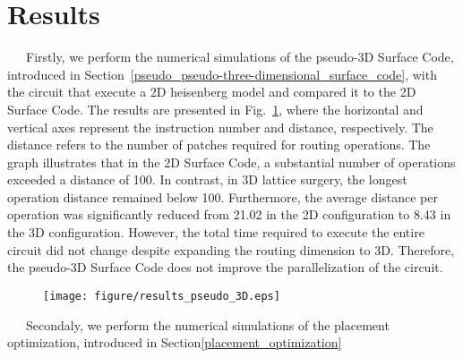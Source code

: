 \documentclass[a4paper,11pt]{ltjsarticle}
\begin{document}
\section{Results}\label{results}{
    \ \ \ Firstly, we perform the numerical simulations of the pseudo-3D Surface Code, introduced in Section~\ref{pseudo_pseudo-three-dimensional_surface_code}, with the circuit that execute a 2D heisenberg model and compared it to the 2D Surface Code. The results are presented in Fig.~\ref{results_of_pseudo_3D}, where the horizontal and vertical axes represent the instruction number and distance, respectively. The distance refers to the number of patches required for routing operations. The graph illustrates that in the 2D Surface Code, a substantial number of operations exceeded a distance of 100. In contrast, in 3D lattice surgery, the longest operation distance remained below 100. Furthermore, the average distance per operation was significantly reduced from 21.02 in the 2D configuration to 8.43 in the 3D configuration. However, the total time required to execute the entire circuit did not change despite expanding the routing dimension to 3D. Therefore, the pseudo-3D Surface Code does not improve the parallelization of the circuit.

    \begin{figure}[h]
        \centering
        \texttt{[image: figure/results\_pseudo\_3D.eps]}
        \vspace{-20pt}\caption{}
        \label{results_of_pseudo_3D}
    \end{figure}
    
    \ \ \ Secondaly, we perform the numerical simulations of the placement optimization, introduced in Section\ref{placement_optimization}

}
\end{document}
